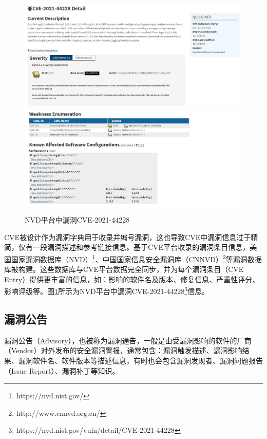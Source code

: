 \begin{figure}[!t]
    \centering
    \includegraphics[width=1.0\textwidth]{fig/NVD-2021-44228}
    \includegraphics[width=1.0\textwidth]{fig/NVD-2021-44228-2}\caption{NVD平台中漏洞CVE-2021-44228}
    \label{fig:NVD-2021-44228}
\end{figure}


CVE被设计作为漏洞字典用于收录并编号漏洞，这也导致CVE中漏洞信息过于精简，仅有一段漏洞描述和参考链接信息。基于CVE平台收录的漏洞条目信息，美国国家漏洞数据库（NVD）\footnote{https://nvd.nist.gov/}、中国国家信息安全漏洞库（CNNVD）\footnote{http://www.cnnvd.org.cn/}等漏洞数据库被构建。这些数据库与CVE平台数据完全同步，并为每个漏洞条目（CVE Entry）提供更丰富的信息，如：影响的软件名及版本、修复信息、严重性评分、影响评级等。图\ref{fig:NVD-2021-44228}所示为NVD平台中漏洞CVE-2021-44228\footnote{https://nvd.nist.gov/vuln/detail/CVE-2021-44228}信息。




\subsection{漏洞公告} 
漏洞公告（Advisory），也被称为漏洞通告，一般是由受漏洞影响的软件的厂商（Vendor）对外发布的安全漏洞警报，通常包含：漏洞触发描述、漏洞影响结果、漏洞软件名、软件版本等描述信息，有时也会包含漏洞发现者、漏洞问题报告（Issue Report）、漏洞补丁等知识。

